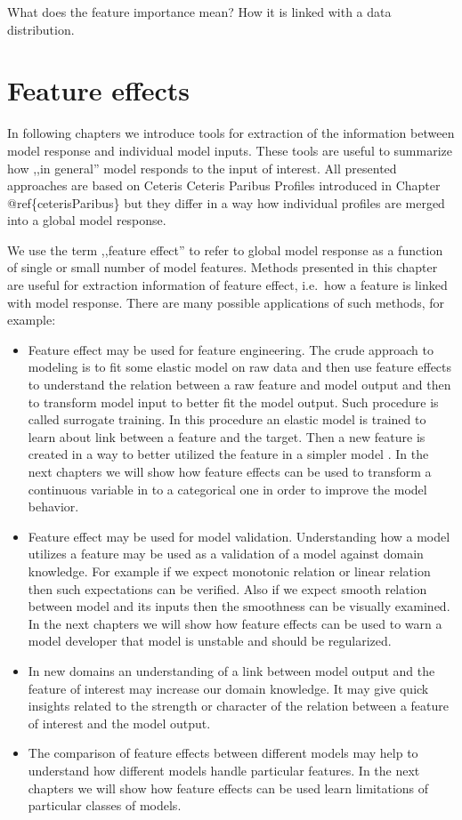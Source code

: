\documentclass[12pt,]{krantz}
\providecommand{\tightlist}{%
  \setlength{\itemsep}{0pt}\setlength{\parskip}{0pt}}
\theoremstyle{definition}
\theoremstyle{definition}
\theoremstyle{definition}
\theoremstyle{remark}
\begin{document}
What does the feature importance mean? How it is linked with a data
distribution.

\hypertarget{featureEffects}{%
\section{Feature effects}\label{featureEffects}}

In following chapters we introduce tools for extraction of the
information between model response and individual model inputs. These
tools are useful to summarize how ,,in general'' model responds to the
input of interest. All presented approaches are based on Ceteris Ceteris
Paribus Profiles introduced in Chapter @ref\{ceterisParibus\} but they
differ in a way how individual profiles are merged into a global model
response.

We use the term ,,feature effect'' to refer to global model response as
a function of single or small number of model features. Methods
presented in this chapter are useful for extraction information of
feature effect, i.e.~how a feature is linked with model response. There
are many possible applications of such methods, for example:

\begin{itemize}
\tightlist
\item
  Feature effect may be used for feature engineering. The crude approach
  to modeling is to fit some elastic model on raw data and then use
  feature effects to understand the relation between a raw feature and
  model output and then to transform model input to better fit the model
  output. Such procedure is called surrogate training. In this procedure
  an elastic model is trained to learn about link between a feature and
  the target. Then a new feature is created in a way to better utilized
  the feature in a simpler model \citep{SAFE-arxiv}. In the next
  chapters we will show how feature effects can be used to transform a
  continuous variable in to a categorical one in order to improve the
  model behavior.
\item
  Feature effect may be used for model validation. Understanding how a
  model utilizes a feature may be used as a validation of a model
  against domain knowledge. For example if we expect monotonic relation
  or linear relation then such expectations can be verified. Also if we
  expect smooth relation between model and its inputs then the
  smoothness can be visually examined. In the next chapters we will show
  how feature effects can be used to warn a model developer that model
  is unstable and should be regularized.
\item
  In new domains an understanding of a link between model output and the
  feature of interest may increase our domain knowledge. It may give
  quick insights related to the strength or character of the relation
  between a feature of interest and the model output.
\item
  The comparison of feature effects between different models may help to
  understand how different models handle particular features. In the
  next chapters we will show how feature effects can be used learn
  limitations of particular classes of models.
\end{itemize}
\end{document}
